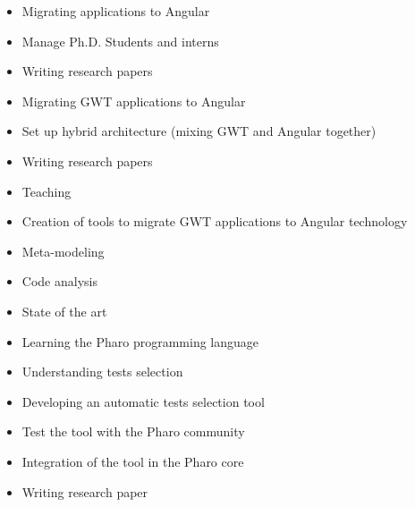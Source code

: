 \documentclass[10pt,a4paper,ragged2e,withhyper]{altacv}
\begin{document}
\begin{paracol}{2}


\begin{itemize}
  \item Migrating applications to Angular
  \item Manage Ph.D. Students and interns
  \item Writing research papers
\end{itemize}

\divider


\begin{itemize}
  \item Migrating GWT applications to Angular
  \item Set up hybrid architecture (mixing GWT and Angular together)
  \item Writing research papers
  \item Teaching
\end{itemize}

\divider


\begin{itemize}
  \item Creation of tools to migrate GWT applications to Angular technology
  \item Meta-modeling
  \item Code analysis
  \item State of the art
\end{itemize}

\divider


\begin{itemize}
  \item Learning the Pharo programming language
  \item Understanding tests selection
  \item Developing an automatic tests selection tool
  \item Test the tool with the Pharo community
  \item Integration of the tool in the Pharo core
  \item Writing research paper
\end{itemize}


\end{paracol}
\end{document}
